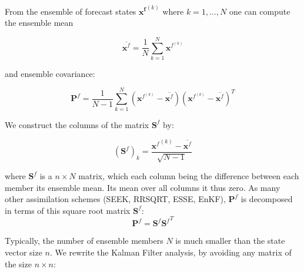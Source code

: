 \documentclass[a4paper,12pt]{article}
\begin{document}
From the ensemble of forecast states $\mathbf {x^f}^{(k)}$ where $k=1,\dots,N$ one can compute the ensemble mean 

\begin{equation}
\overline{\mathbf x^{f}}=\frac{1}{N}\sum_{k=1}^N \mathbf x^{f^{(k)}} %
\end{equation}

and ensemble covariance:

\begin{equation}
\mathbf P^f =\frac{1}{N-1} \sum_{k=1}^N 
\left( \mathbf x^{f^{(k)}} - \overline{\mathbf x^{f}} \right) 
\left( \mathbf x^{f^{(k)}} - \overline{\mathbf x^{f}} \right)^T 
\end{equation}

We construct the columns of the matrix $\mathbf S^f$ by:

\begin{equation}
\left( \mathbf{S}^f \right)_k =\frac{{\mathbf{x}^f}^{(k)}-\overline{\mathbf{x}^f}}{\sqrt{N-1}} \label{Saf}
\end{equation}

where $\mathbf S^f$ is a $n \times N$ matrix, which each column being the difference between each member its ensemble mean.
Its mean over all columns it thus zero.
As many other assimilation schemes (SEEK, RRSQRT, ESSE, EnKF), $\mathbf P^f$ is decomposed in terms of this square root 
matrix $\mathbf S^f$:
\begin{equation}
\mathbf P^f = \mathbf S^f {\mathbf S^f}^T   \label{PfSf}
\end{equation}



Typically, the number of ensemble members $N$ is much smaller than the state vector size $n$. We rewrite the Kalman Filter analysis, by avoiding any matrix of the size $n \times n$:

\end{document}
